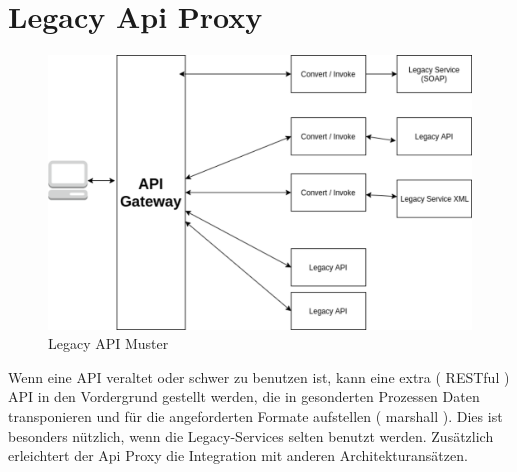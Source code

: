 \documentclass[
12pt,
english,
ngerman,
headsepline,
twoside,
openright,
numbers=noenddot,version=first
]{scrreprt}
\begin{document}
\section{Legacy Api Proxy}
\begin{figure}[H]
	\centering
	\includegraphics[scale=0.60]{./pics/legacy-api-proxy.eps}
	\caption{Legacy API Muster}
	\label{legacy-api-proxy}
\end{figure}
	
Wenn eine \acrshort{API} veraltet oder schwer zu benutzen ist, kann eine extra ( RESTful ) \acrshort{API} in den Vordergrund gestellt werden, die in gesonderten Prozessen Daten transponieren und für die angeforderten Formate aufstellen ( marshall ). Dies ist besonders nützlich, wenn die Legacy-Services selten benutzt werden. Zusätzlich erleichtert der Api Proxy die Integration mit anderen Architekturansätzen.
\end{document}
